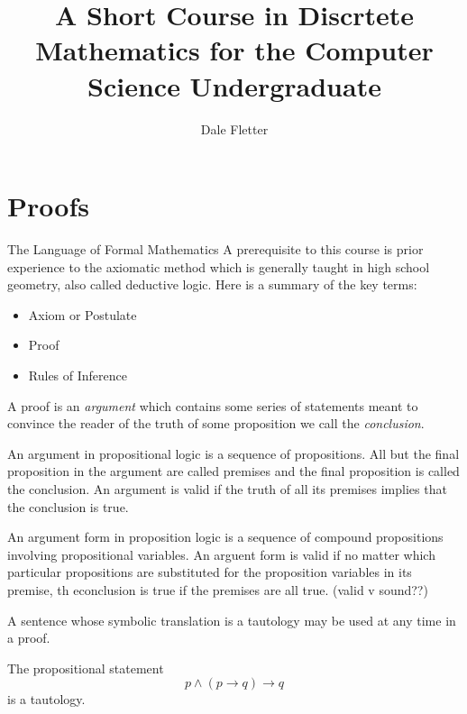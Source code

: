 \documentclass{beamer}
\title[Discrete Math]{A Short Course in Discrtete Mathematics for the Computer Science Undergraduate}
\author{Dale Fletter}
\institute{UC Davis, ECS20, Summer Session 2}
\date{}
\begin{document}
\begin{frame}
\titlepage
\end{frame}

\section{Proofs}

\begin{frame}{The Language of Formal Mathematics}
A prerequisite to this course is prior experience to the axiomatic method which is generally taught in high school geometry, also called deductive logic. Here is a summary of the key terms:
\begin{itemize}
\item Axiom or Postulate
\item Proof
\item Rules of Inference
\end{itemize}
\end{frame}

\begin{frame}
A proof is an \textit{argument} which contains some series of statements meant to convince the reader of the truth of some proposition we call the \textit{conclusion}.
\end{frame}

\begin{frame}
An argument in propositional logic is a sequence of propositions. All but the final proposition in the argument are called premises and the final proposition is called the conclusion. An argument is valid if the truth of all its premises implies that the conclusion is true.

An argument form in proposition logic is a sequence of compound propositions involving propositional variables. An arguent form is valid if no matter which particular propositions are substituted for the proposition variables in its premise, th econclusion is true if the premises are all true. (valid v sound??)
\end{frame}

\begin{frame}
A sentence whose symbolic translation is a tautology may be used at any time in a proof.
\end{frame}

\begin{frame}
The propositional statement
$$p \land (p \rightarrow q) \rightarrow q$$
is a tautology.
\end{frame}
\end{document}
